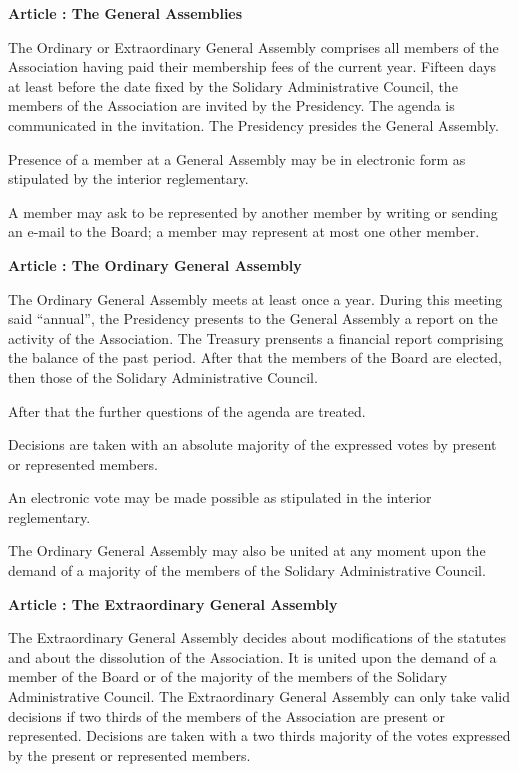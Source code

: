 \documentclass [11pt]{article}
\renewcommand {\section}[1]{\stepcounter {section}%
{\vspace {1em}\noindent\Large \bf Article \thesection: #1 \par}}
\begin{document}
\section {The General Assemblies}

The Ordinary or Extraordinary General Assembly comprises all members
of the Association having paid their membership fees of the current year.
Fifteen days at least before the date fixed by the Solidary Administrative
Council, the members of the Association are invited by the Presidency.
The agenda is communicated in the invitation.
The Presidency presides the General Assembly.

Presence of a member at a General Assembly may be in electronic form
as stipulated by the interior reglementary.

A member may ask to be represented by another member by writing or sending
an e-mail to the Board; a member may represent at most one other member.


\section {The Ordinary General Assembly}

The Ordinary General Assembly meets at least once a year.
During this meeting said ``annual'', the Presidency presents to
the General Assembly a report on the activity of the Association.
The Treasury prensents a financial report comprising the balance
of the past period.
After that the members of the Board are elected, then those of the
Solidary Administrative Council.

After that the further questions of the agenda are treated.

Decisions are taken with an absolute majority of the expressed votes
by present or represented members.

An electronic vote may be made possible as stipulated in the interior
reglementary.

The Ordinary General Assembly may also be united at any moment upon
the demand of a majority of the members of the Solidary Administrative
Council.


\newpage
\section {The Extraordinary General Assembly}

The Extraordinary General Assembly decides about modifications of the
statutes and about the dissolution of the Association. It is united
upon the demand of a member of the Board or of the majority of the
members of the Solidary Administrative Council. The Extraordinary General
Assembly can only take valid decisions if two thirds of the members
of the Association are present or represented.
Decisions are taken with a two thirds majority of the votes
expressed by the present or represented members.
\end{document}
